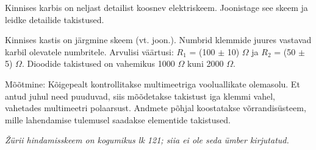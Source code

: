 
Kinnises karbis on neljast detailist koosnev elektriskeem. Joonistage see skeem ja leidke detailide takistused.

\hint

\solu
Kinnises kastis on järgmine skeem (vt. joon.). Numbrid klemmide juures vastavad karbil olevatele numbritele. Arvulisi väärtusi: $R_1$ = (100 $\pm$ 10) $\Omega$ ja $R_2$ = (50 $\pm$ 5) $\Omega$. Dioodide takistused on vahemikus 1000 $\Omega$ kuni 2000 $\Omega$.

Mõõtmine: Kõigepealt kontrollitakse multimeetriga vooluallikate olemasolu. Et antud juhul need puuduvad, siis mõõdetakse takistust iga klemmi vahel, vahetades multimeetri polaarsust. Andmete põhjal koostatakse võrrandisüsteem, mille lahendamise tulemusel saadakse elementide takistused.

\textit{Žürii hindamisskeem on kogumikus lk 121; siia ei ole seda ümber kirjutatud.}
\probend
